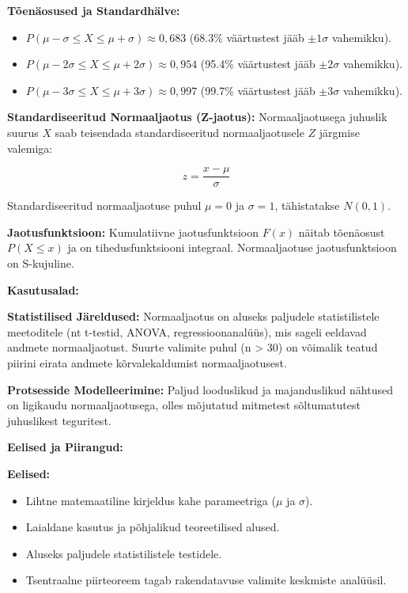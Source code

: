 \documentclass[
]{book}
\providecommand{\tightlist}{%
  \setlength{\itemsep}{0pt}\setlength{\parskip}{0pt}}
\begin{document}
\textbf{Tõenäosused ja Standardhälve:}

\begin{itemize}
\tightlist
\item
  \(P(\mu - \sigma \le X \le \mu + \sigma) \approx 0,683\) (68.3\% väärtustest jääb \(\pm 1\sigma\) vahemikku).
\item
  \(P(\mu - 2\sigma \le X \le \mu + 2\sigma) \approx 0,954\) (95.4\% väärtustest jääb \(\pm 2\sigma\) vahemikku).
\item
  \(P(\mu - 3\sigma \le X \le \mu + 3\sigma) \approx 0,997\) (99.7\% väärtustest jääb \(\pm 3\sigma\) vahemikku).
\end{itemize}

\textbf{Standardiseeritud Normaaljaotus (Z-jaotus):} Normaaljaotusega juhuslik suurus \(X\) saab teisendada standardiseeritud normaaljaotusele \(Z\) järgmise valemiga:

\[z = \frac{x - \mu}{\sigma}\]

Standardiseeritud normaaljaotuse puhul \(\mu = 0\) ja \(\sigma = 1\), tähistatakse \(N(0,1)\).

\textbf{Jaotusfunktsioon:} Kumulatiivne jaotusfunktsioon \(F(x)\) näitab tõenäosust \(P(X \le x)\) ja on tihedusfunktsiooni integraal. Normaaljaotuse jaotusfunktsioon on S-kujuline.

\textbf{Kasutusalad:}

\textbf{Statistilised Järeldused:} Normaaljaotus on aluseks paljudele statistilistele meetoditele (nt t-testid, ANOVA, regressioonanalüüs), mis sageli eeldavad andmete normaaljaotust. Suurte valimite puhul (n \textgreater{} 30) on võimalik teatud piirini eirata andmete kõrvalekaldumist normaaljaotusest.

\textbf{Protsesside Modelleerimine:} Paljud looduslikud ja majanduslikud nähtused on ligikaudu normaaljaotusega, olles mõjutatud mitmetest sõltumatutest juhuslikest teguritest.

\textbf{Eelised ja Piirangud:}

\textbf{Eelised:}

\begin{itemize}
\tightlist
\item
  Lihtne matemaatiline kirjeldus kahe parameetriga (\(\mu\) ja \(\sigma\)).
\item
  Laialdane kasutus ja põhjalikud teoreetilised alused.
\item
  Aluseks paljudele statistilistele testidele.
\item
  Tsentraalne piirteoreem tagab rakendatavuse valimite keskmiste analüüsil.
\end{itemize}
\end{document}
